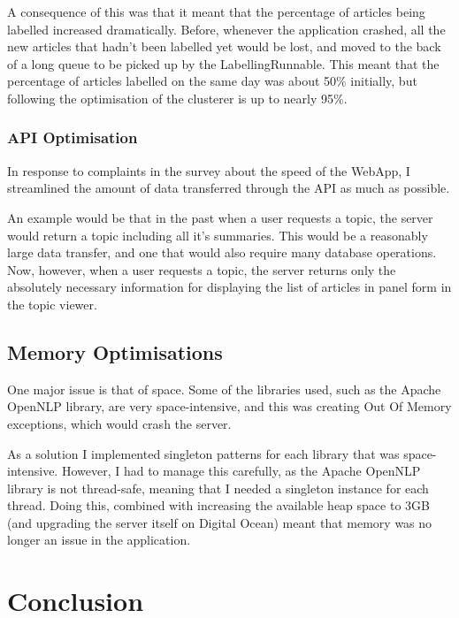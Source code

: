 \documentclass[12pt]{article}
\begin{document}
A consequence of this was that it meant that the percentage of articles being labelled increased dramatically. Before, whenever the application crashed, all the new articles that hadn't been labelled yet would be lost, and moved to the back of a long queue to be picked up by the LabellingRunnable. This meant that the percentage of articles labelled on the same day was about 50\% initially, but following the optimisation of the clusterer is up to nearly 95\%. 

\subsubsection{API Optimisation}

In response to complaints in the survey about the speed of the WebApp, I streamlined the amount of data transferred through the API as much as possible. 

An example would be that in the past when a user requests a topic, the server would return a topic including all it's summaries. This would be a reasonably large data transfer, and one that would also require many database operations. Now, however, when a user requests a topic, the server returns only the absolutely necessary information for displaying the list of articles in panel form in the topic viewer. 

\label{apioptimisation}

\subsection{Memory Optimisations}

One major issue is that of space. Some of the libraries used, such as the Apache OpenNLP library, are very space-intensive, and this was creating Out Of Memory exceptions, which would crash the server. 

As a solution I implemented singleton patterns for each library that was space-intensive. However, I had to manage this carefully, as the Apache OpenNLP library is not thread-safe, meaning that I needed a singleton instance for each thread. Doing this, combined with increasing the available heap space to 3GB (and upgrading the server itself on Digital Ocean) meant that memory was no longer an issue in the application.


\newpage

\section{Conclusion}
\end{document}
